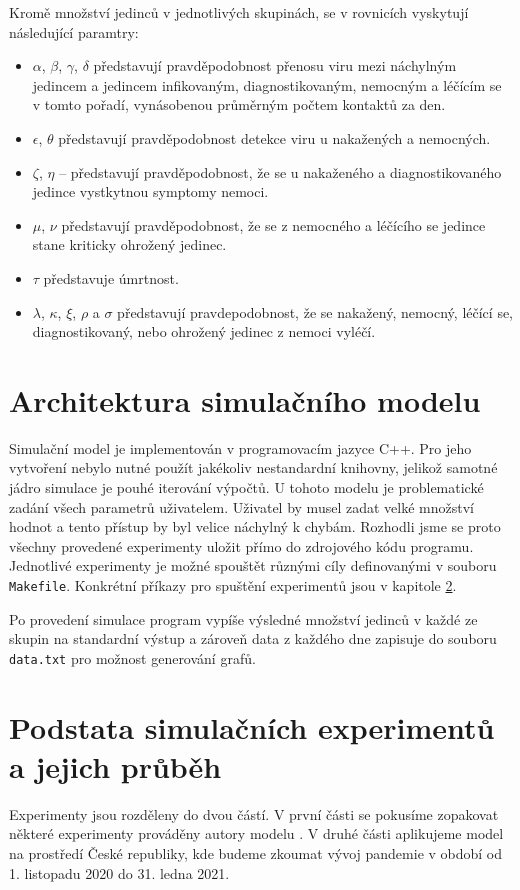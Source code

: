 \documentclass[a4paper,11pt]{article}
\begin{document}
	Kromě množství jedinců v jednotlivých skupinách, se v rovnicích vyskytují následující paramtry:
	\begin{itemize}
		\item $\alpha$, $\beta$, $\gamma$, $\delta$ představují pravděpodobnost přenosu viru mezi náchylným jedincem a jedincem infikovaným, diagnostikovaným, nemocným a léčícím se v tomto pořadí, vynásobenou průměrným počtem kontaktů za den.
		\item $\epsilon$, $\theta$ představují pravděpodobnost detekce viru u nakažených a nemocných.
		\item $\zeta$, $\eta$ -- představují pravděpodobnost, že se u nakaženého a diagnostikovaného jedince vystkytnou symptomy nemoci.
		\item $\mu$, $\nu$ představují pravděpodobnost, že se z nemocného a léčícího se jedince stane kriticky ohrožený jedinec.
		\item $\tau$ představuje úmrtnost.
		\item $\lambda$, $\kappa$, $\xi$, $\rho$ a $\sigma$ představují pravdepodobnost, že se nakažený, nemocný, léčící se, diagnostikovaný, nebo ohrožený jedinec z nemoci vyléčí.
	\end{itemize}
		
	\section{Architektura simulačního modelu}
		Simulační model je implementován v programovacím jazyce C++. Pro jeho vytvoření nebylo nutné použít jakékoliv nestandardní knihovny, jelikož samotné jádro simulace je pouhé iterování výpočtů. U tohoto modelu je problematické zadání všech parametrů uživatelem. Uživatel by musel zadat velké množství hodnot a tento přístup by byl velice náchylný k chybám. Rozhodli jsme se proto všechny provedené experimenty uložit přímo do zdrojového kódu programu. Jednotlivé experimenty je možné spouštět různými cíly definovanými v souboru \texttt{Makefile}. Konkrétní příkazy pro spuštění experimentů jsou v kapitole \ref{experiments}.
		
		Po provedení simulace program vypíše výsledné množství jedinců v každé ze skupin na standardní výstup a zároveň data z každého dne zapisuje do souboru \texttt{data.txt} pro možnost generování grafů.
		
	\section{Podstata simulačních experimentů a jejich průběh}
	\label{experiments}
		Experimenty jsou rozděleny do dvou částí. V první části se pokusíme zopakovat některé experimenty prováděny autory modelu \cite{source}. V druhé části aplikujeme model na prostředí České republiky, kde budeme zkoumat vývoj pandemie v období od 1. listopadu 2020 do 31. ledna 2021.
		
\end{document}
